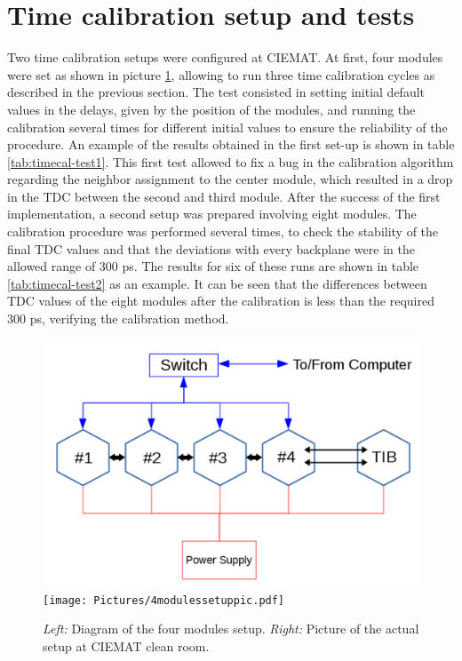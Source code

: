 \documentclass[main.tex]{subfiles}
\begin{document}
\section{Time calibration setup and tests}

Two time calibration setups were configured at CIEMAT. At first, four modules were set as shown in picture \ref{fig:timecalfig1}, allowing to run three time calibration cycles as described in the previous section. The test consisted in setting initial default values in the delays, given by the position of the modules, and running the calibration several times for different initial values to ensure the reliability of the procedure. An example of the results obtained in the first set-up is shown in table \ref{tab:timecal-test1}. This first test allowed to fix a bug in the calibration algorithm regarding the neighbor assignment to the center module, which resulted in a drop in the TDC between the second and third module.
After the success of the first implementation, a second setup was prepared involving eight modules. The calibration procedure was performed several times, to check the stability of the final TDC values and that the deviations with every backplane were in the allowed range of 300 ps. The results for six of these runs are shown in table \ref{tab:timecal-test2} as an example. It can be seen that the differences between TDC values of the eight modules after the calibration is less than the required 300 ps, verifying the calibration method.

\begin{figure}[!htb]
  \includegraphics[width=\linewidth]{Pictures/4modulessetupdiagram.pdf}
  \endminipage\hfill
  \texttt{[image: Pictures/4modulessetuppic.pdf]}
  \endminipage\hfill
  \caption{\label{fig:timecalfig1}\textit{Left:} Diagram of the four modules setup. \textit{Right:} Picture of the actual setup at CIEMAT clean room.}
\end{figure}
\end{document}
